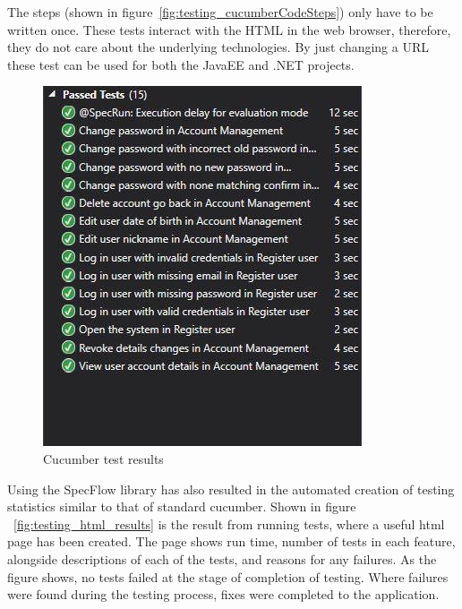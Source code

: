 The steps (shown in figure~\ref{fig:testing_cucumberCodeSteps}) only have to be written once. These tests interact with the HTML in the web browser, therefore, they do not care about the underlying technologies. By just changing a URL these test can be used for both the JavaEE and .NET projects. 

\begin{figure}[H]
\begin{center}
\includegraphics[scale=0.6]{images/testing/cucumberPassedTests.jpg} 
\caption{Cucumber test results}
\label{fig:testing_cucumberPassedTests}
\end{center}
\end{figure}

Using the SpecFlow library has also resulted in the automated creation of testing statistics similar to that of standard cucumber. Shown in figure ~\ref{fig:testing_html_results} is the result from running tests, where a useful html page has been created. The page shows run time, number of tests in each feature, alongside descriptions of each of the tests, and reasons for any failures. As the figure shows, no tests failed at the stage of completion of testing. Where failures were found during the testing process, fixes were completed to the application.

